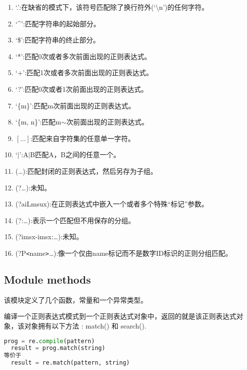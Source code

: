 \begin{enumerate}
\item \textquoteleft{.}\textquoteright{}:在缺省的模式下，该符号匹配除了换行符外(\textquoteleft{}\textbackslash{n}\textquoteright{})的任何字符。
\item \textquoteleft{}\^{}\textquoteright{}:匹配字符串的起始部分。
\item \textquoteleft{}\$\textquoteright{}:匹配字符串的终止部分。
\item \textquoteleft{}*\textquoteright{}:匹配0次或者多次前面出现的正则表达式。
\item \textquoteleft{}+\textquoteright{}:匹配1次或者多次前面出现的正则表达式。
\item \textquoteleft{}?\textquoteright{}:匹配0次或者1次前面出现的正则表达式。
\item \textquoteleft{}\{m\}\textquoteright{}:匹配m次前面出现的正则表达式。
\item \textquoteleft{}\{m, n\}\textquoteright{}:匹配m$\sim$次前面出现的正则表达式。
\item $\left[\dots\right]$:匹配来自字符集的任意单一字符。
\item \textquoteleft{}$|$\textquoteright{}:A$|$B匹配A，B之间的任意一个。
\item (\dots):匹配封闭的正则表达式，然后另存为子组。
\item (?\dots):未知。
\item (?aiLmsux):在正则表达式中嵌入一个或者多个特殊\textquotedblleft{标记}\textquotedblright{}参数。
\item (?:\dots):表示一个匹配但不用保存的分组。
\item (?imsx-imsx:\dots):未知。
\item (?P\texttt{<}name\texttt{>}\dots{}):像一个仅由name标记而不是数字ID标识的正则分组匹配。
\end{enumerate}

\subsection{Module methods}
该模块定义了几个函数，常量和一个异常类型。\\

\noindent{\color{red}{re.compile(pattern, flags=0):}}
\par{编译一个正则表达式模式到一个正则表达式对象中，返回的就是该正则表达式对象，该对象拥有以下方法 : match() 和 search().}
\begin{lstlisting}[language=Python]
  prog = re.compile(pattern)
  result = prog.match(string)
等价于
  result = re.match(pattern, string)
\end{lstlisting}

